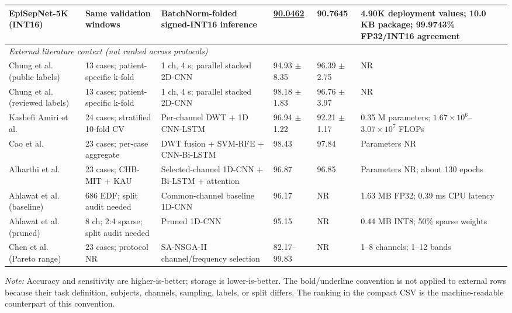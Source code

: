 \begin{table}[t]
\begin{tabularx}{\textwidth}{p{2.8cm}p{3.1cm}Xp{1.35cm}p{1.35cm}p{2.75cm}}
EpiSepNet-5K (INT16) &
Same validation windows &
BatchNorm-folded signed-INT16 inference &
\underline{90.0462} & \textbf{90.7645} &
4.90K deployment values; \textbf{10.0 KB} package; 99.9743\% FP32/INT16 agreement \\
\midrule
\multicolumn{6}{l}{\textit{External literature context (not ranked across protocols)}} \\
Chung et al. (public labels)~\cite{chung2024} &
13 cases; patient-specific k-fold &
1 ch, 4 s; parallel stacked 2D-CNN &
94.93 $\pm$ 8.35 & 96.39 $\pm$ 2.75 & NR \\
Chung et al. (reviewed labels)~\cite{chung2024} &
13 cases; patient-specific k-fold &
1 ch, 4 s; parallel stacked 2D-CNN &
98.18 $\pm$ 1.83 & 96.76 $\pm$ 3.97 & NR \\
Kashefi Amiri et al.~\cite{kashefi2025} &
24 cases; stratified 10-fold CV &
Per-channel DWT + 1D CNN-LSTM &
96.94 $\pm$ 1.22 & 92.21 $\pm$ 1.17 &
0.35 M parameters; $1.67\times10^6$--$3.07\times10^7$ FLOPs \\
Cao et al.~\cite{cao2025} &
23 cases; per-case aggregate &
DWT fusion + SVM-RFE + CNN-Bi-LSTM &
98.43 & 97.84 & Parameters NR \\
Alharthi et al.~\cite{alharthi2022} &
23 cases; CHB-MIT + KAU &
Selected-channel 1D-CNN + Bi-LSTM + attention &
96.87 & 96.85 & Parameters NR; about 130 epochs \\
Ahlawat et al. (baseline)~\cite{ahlawat2026} &
686 EDF; split audit needed &
Common-channel baseline 1D-CNN &
96.17 & NR & 1.63 MB FP32; 0.39 ms CPU latency \\
Ahlawat et al. (pruned)~\cite{ahlawat2026} &
8 ch; 2:4 sparse; split audit needed &
Pruned 1D-CNN &
95.15 & NR & 0.44 MB INT8; 50\% sparse weights \\
Chen et al. (Pareto range)~\cite{chen2026} &
23 cases; protocol NR &
SA-NSGA-II channel/frequency selection &
82.17--99.83 & NR & 1--8 channels; 1--12 bands \\
\bottomrule
\end{tabularx}
\vspace{2pt}
\parbox{\textwidth}{\scriptsize\textit{Note:} Accuracy and sensitivity are
higher-is-better; storage is lower-is-better. The bold/underline convention is
not applied to external rows because their task definition, subjects, channels,
sampling, labels, or split differs. The ranking in the compact CSV is the
machine-readable counterpart of this convention.}
\end{table}
